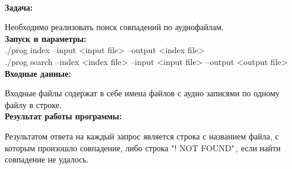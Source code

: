 \\

\noindent \textbf{Задача:}

Необходимо реализовать поиск совпадений по аудиофайлам.\\

\noindent \textbf{Запуск и параметры: }
\\
./prog index --input <input file> --output <index file>\\
./prog search --index <index file> --input <input file> --output <output file>\\

\noindent \textbf{Входные данные: }

Входные файлы содержат в себе имена файлов с аудио записями по одному файлу в строке.\\

\noindent \textbf{Результат работы программы: }

Результатом ответа на каждый запрос является строка с названием файла, с которым произошло совпадение, либо строка "! NOT FOUND"\,, если найти совпадение не удалось.

\pagebreak